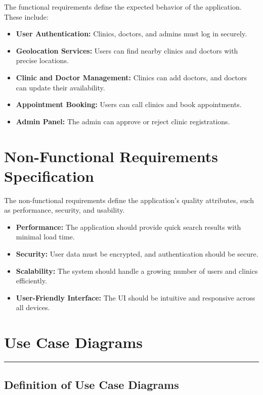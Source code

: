 \documentclass[12pt]{report}
\begin{document}
\noindent The functional requirements define the expected behavior of the application. These include:

\begin{itemize}
	\item \textbf{User Authentication:} Clinics, doctors, and admins must log in securely.
	\item \textbf{Geolocation Services:} Users can find nearby clinics and doctors with precise locations.
	\item \textbf{Clinic and Doctor Management:} Clinics can add doctors, and doctors can update their availability.
	\item \textbf{Appointment Booking:} Users can call clinics and book appointments.
	\item \textbf{Admin Panel:} The admin can approve or reject clinic registrations.
\end{itemize}

\section{\textbf{Non-Functional Requirements Specification}}

\noindent The non-functional requirements define the application's quality attributes, such as performance, security, and usability.

\begin{itemize}
	\item \textbf{Performance:} The application should provide quick search results with minimal load time.
	\item \textbf{Security:} User data must be encrypted, and authentication should be secure.
	\item \textbf{Scalability:} The system should handle a growing number of users and clinics efficiently.
	\item \textbf{User-Friendly Interface:} The UI should be intuitive and responsive across all devices.
\end{itemize}


\section{\textbf{Use Case Diagrams}}
\rule{0.45\linewidth}{0.7pt}
\subsection{\textbf{Definition of Use Case Diagrams}}
\end{document}
